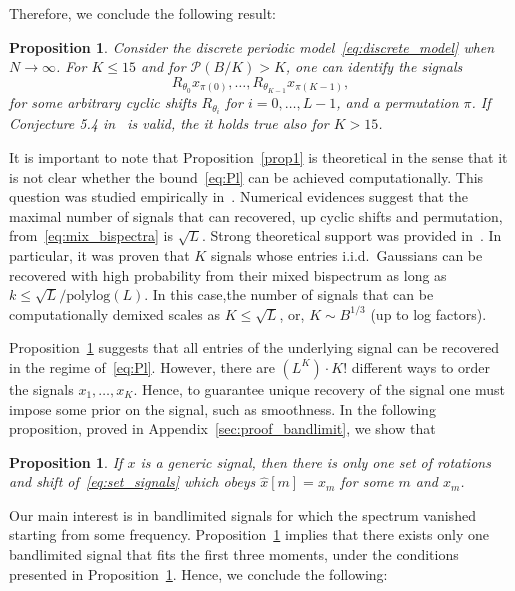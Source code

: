 \documentclass[english,12pt]{article}
\newcommand{\hx}{\hat{x}}
\newcommand{\TODO}[1]{{\color{red}{[#1]}}}
\numberwithin{equation}{section}
\numberwithin{thm}{section} %
\newtheorem{prop}[thm]{Proposition}
\begin{document}
Therefore, we conclude the following result:
\begin{prop} \label{prop1}
Consider the  discrete periodic model~\eqref{eq:discrete_model} when $N\to\infty$. 
For $K\leq 15$ and for $\mathcal{P}(B/K)>K$, one can identify the signals 
\begin{equation} \label{eq:set_signals}
R_{\theta_0}x_{\pi(0)}, \ldots,R_{\theta_{K-1}}x_{\pi(K-1)},
\end{equation}
for some arbitrary cyclic shifts $R_{\theta_i}$ for $i=0,\ldots,L-1$, and a permutation $\pi$.
If Conjecture 5.4 in~\cite{bandeira2017estimation} is valid, the it holds true also for $K>15$.
\end{prop}	

It is important to note that Proposition~\eqref{prop1} is theoretical in the sense that it is not clear whether the bound~\eqref{eq:Pl} can be achieved computationally.  
This question was studied empirically in~\cite{boumal2018heterogeneous}. Numerical evidences suggest that the maximal number of signals that can recovered, up cyclic shifts and permutation, from~\eqref{eq:mix_bispectra} is $\sqrt{L}$. 
Strong theoretical support was provided in~\cite{weinthesis}. In particular,  it was proven that $K$ signals whose entries i.i.d.\ Gaussians can be recovered with high probability from their mixed bispectrum as long as $k\leq \sqrt{L}/\text{polylog}(L)$.
In this case,the number of signals that can be computationally 
demixed scales as $K\leq \sqrt{L}$, or, $K\sim B^{1/3}$ (up to log factors).  



Proposition~\ref{prop1} suggests that all entries of the underlying signal can be recovered in the regime of~\eqref{eq:Pl}. However, there are $(L^K)\cdot K!$ \TODO{check this number}  different ways to order the signals $x_1,\ldots,x_K$. Hence, to guarantee unique recovery of the signal one must impose some prior on the signal, such as smoothness. In the following proposition, proved in Appendix~\ref{sec:proof_bandlimit}, we show that

\begin{prop} \label{prop:bandlimit}
If $x$ is a generic signal, then there is only one set of rotations and shift of~\eqref{eq:set_signals} which obeys $\hx[m]=x_m$ for some $m$ and $x_m$.
\end{prop}	

Our main interest is in bandlimited signals for which the spectrum vanished starting from some frequency. Proposition~\ref{prop:bandlimit} implies that there exists only one bandlimited signal that fits the first three moments, under the conditions presented in Proposition~\ref{prop1}. 
Hence, we conclude the following:
\end{document}
